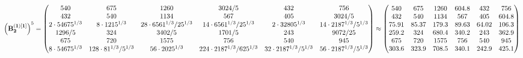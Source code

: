 \documentclass[10pt,a4paper]{article}
\begin{document}
	\[
		\left(\bold{B_2^{(1)[1]}}\right)^{5} = 
		\begin{pmatrix}
			{{540}}{} & {{675}}{} & {{1260}}{} & {{3024}} / {{5}} & {{432}}{} & {{756}}{} \\
			{{432}}{} & {{540}}{} & {{1134}}{} & {{567}}{} & {{405}}{} & {{3024}} / {{5}} \\
			{{2} \cdot {54675^ {1 / 3}}}{} & {{8} \cdot {1215^ {1 / 3}}}{} & {{28} \cdot {6561^ {1 / 3}}} / {{25^ {1 / 3}}} & {{14} \cdot {6561^ {1 / 3}}} / {{25^ {1 / 3}}} & {{2} \cdot {32805^ {1 / 3}}}{} & {{14} \cdot {2187^ {1 / 3}}} / {{5^ {1 / 3}}} \\
			{{1296}} / {{5}} & {{324}}{} & {{3402}} / {{5}} & {{1701}} / {{5}} & {{243}}{} & {{9072}} / {{25}} \\
			{{675}}{} & {{720}}{} & {{1575}}{} & {{756}}{} & {{540}}{} & {{945}}{} \\
			{{8} \cdot {54675^ {1 / 3}}}{} & {{128} \cdot {81^ {1 / 3}}} / {{5^ {1 / 3}}} & {{56} \cdot {2025^ {1 / 3}}}{} & {{224} \cdot {2187^ {1 / 3}}} / {{625^ {1 / 3}}} & {{32} \cdot {2187^ {1 / 3}}} / {{5^ {1 / 3}}} & {{56} \cdot {2187^ {1 / 3}}} / {{5^ {1 / 3}}} \\
		\end{pmatrix}
		\approx
		\begin{pmatrix}
			540      & 675      & 1260     & 604.8    & 432      & 756      \\
			432      & 540      & 1134     & 567      & 405      & 604.8    \\
			75.91    & 85.37    & 179.3    & 89.63    & 64.02    & 106.3    \\
			259.2    & 324      & 680.4    & 340.2    & 243      & 362.9    \\
			675      & 720      & 1575     & 756      & 540      & 945      \\
			303.6    & 323.9    & 708.5    & 340.1    & 242.9    & 425.1    \\
		\end{pmatrix}
	\]
\end{document}

